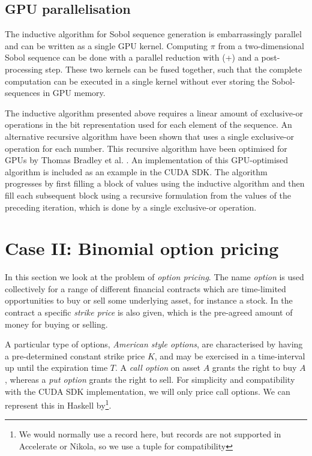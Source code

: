 \documentclass[preprint]{sigplanconf}
\begin{document}

\subsection{GPU parallelisation}
\label{sec:gpusobol}
The inductive algorithm for Sobol sequence generation is
embarrassingly parallel and can be written as a single GPU
kernel. Computing $\pi$ from a two-dimensional Sobol sequence can be
done with a parallel reduction with (+) and a post-processing
step. These two kernels can be fused together, such that the complete
computation can be executed in a single kernel without ever storing
the Sobol-sequences in GPU memory.

The inductive algorithm presented above requires a linear amount of
exclusive-or operations in the bit representation used for each
element of the sequence. An alternative recursive algorithm have been
shown that uses a single exclusive-or operation for each number. This
recursive algorithm have been optimised for GPUs by Thomas Bradley et
al. \cite[Chapter~16]{hwy2011emerald}. An implementation of this
GPU-optimised algorithm is included as an example in the CUDA SDK. The
algorithm progresses by first filling a block of values using the
inductive algorithm and then fill each subsequent block using a
recursive formulation from the values of the preceding iteration,
which is done by a single exclusive-or operation.

\section{Case II: Binomial option pricing}
In this section we look at the problem of \emph{option pricing}. The
name \emph{option} is used collectively for a range of different
financial contracts which are time-limited opportunities to buy or
sell some underlying asset, for instance a stock. In the contract a
specific \emph{strike price} is also given, which is the pre-agreed
amount of money for buying or selling.

A particular type of options, \emph{American style options}, are
characterised by having a pre-determined constant strike price $K$,
and may be exercised in a time-interval up until the expiration time
$T$. A \emph{call option} on asset $A$ grants the right to buy $A$,
whereas a \emph{put option} grants the right to sell. For simplicity
and compatibility with the CUDA SDK implementation, we will only price
call options. We can represent this in Haskell by\footnote{We would
  normally use a record here, but records are not supported in
  Accelerate or Nikola, so we use a tuple for compatibility}.
\end{document}
